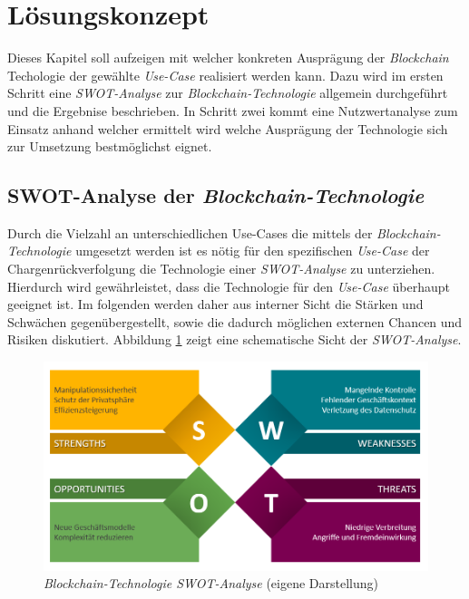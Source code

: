 \section{Lösungskonzept} \label{sec:solution-concept}

Dieses Kapitel soll aufzeigen mit welcher konkreten Ausprägung der \textit{Blockchain} Techologie der gewählte \textit{Use-Case} realisiert werden kann. Dazu wird im ersten Schritt eine \textit{SWOT-Analyse} zur \textit{Blockchain-Technologie} allgemein durchgeführt und die Ergebnise beschrieben. In Schritt zwei kommt eine Nutzwertanalyse zum Einsatz anhand welcher ermittelt wird welche Ausprägung der Technologie sich zur Umsetzung bestmöglichst eignet.

\subsection{SWOT-Analyse der \textit{Blockchain-Technologie}} \label{swot-analyse}
Durch die Vielzahl an unterschiedlichen Use-Cases die mittels der \textit{Blockchain-Tech\-nologie} umgesetzt werden ist es nötig für den spezifischen \textit{Use-Case} der Chargenrückverfolgung die Technologie einer \textit{SWOT-Analyse} zu unterziehen. Hierdurch wird gewährleistet, dass die Technologie für den \textit{Use-Case} überhaupt geeignet ist. Im folgenden werden daher aus interner Sicht die Stärken und Schwächen gegenübergestellt, sowie die dadurch möglichen externen Chancen und Risiken diskutiert. Abbildung \ref{fig:blockchain-technology-swot-analysis} zeigt eine schematische Sicht der \textit{SWOT-Analyse}.

\begin{figure}[H]
	\centering
	\includegraphics[width=1\linewidth]{pictures/blockchain-technology-swot-analysis}
	\caption[\textit{Blockchain-Technologie SWOT-Analyse}]{\textit{Blockchain-Technologie SWOT-Analyse} (eigene Darstellung)}
	\label{fig:blockchain-technology-swot-analysis}
\end{figure}

